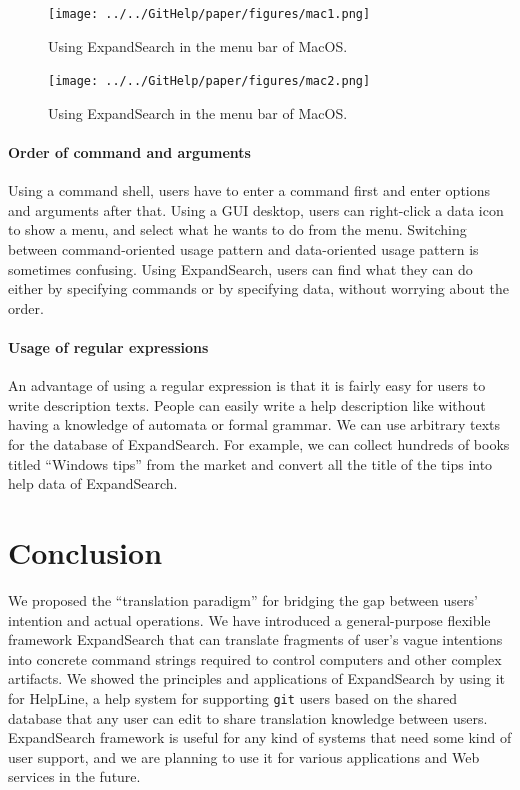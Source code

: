 \documentclass[manuscript,anonymous,review]{acmart}
\def\HL{\textsf{HelpLine}}
\def\GIT{\texttt{git}}
\def\ES{\textsf{ExpandSearch}}
\begin{document}
\begin{figure}[h]
  \centerline{\texttt{[image: ../../GitHelp/paper/figures/mac1.png]}}
  \caption{Using {\ES} in the menu bar of MacOS.}
  \label{mac1}
\end{figure}

\begin{figure}[h]
  \centerline{\texttt{[image: ../../GitHelp/paper/figures/mac2.png]}}
  \caption{Using {\ES} in the menu bar of MacOS.}
  \label{mac2}
\end{figure}

\paragraph{Order of command and arguments}

Using a command shell,
users have to enter a command first and enter options and arguments after that.
Using a GUI desktop,
users can right-click a data icon to show a menu,
and select what he wants to do from the menu.
Switching between command-oriented usage pattern and
data-oriented usage pattern is sometimes confusing.
Using {\ES}, users can find what they can do
either by specifying commands or by specifying data, 
without worrying about the order.

\paragraph{Usage of regular expressions}

An advantage of using a regular expression is that
it is fairly easy for users to write description texts.
People can easily write a help description like
without having a knowledge of automata or formal grammar.
We can use arbitrary texts for the database of {\ES}.
For example,
we can collect hundreds of books titled ``Windows tips'' from the market
and convert all the title of the tips into help data of {\ES}.

\section{Conclusion}

We proposed the ``translation paradigm'' for bridging the gap between
users' intention and actual operations.
%
We have introduced a general-purpose flexible framework {\ES}
that can translate fragments of user's vague intentions into
concrete command strings required to control computers and
other complex artifacts.
We showed the principles and applications of {\ES} by using it
for {\HL}, a help system for supporting {\GIT} users
based on the shared database that any user can edit to share
translation knowledge between users.
%
{\ES} framework is useful for any kind of systems that need
some kind of user support, and we are planning to use it
for various applications and Web services in the future.
\end{document}
